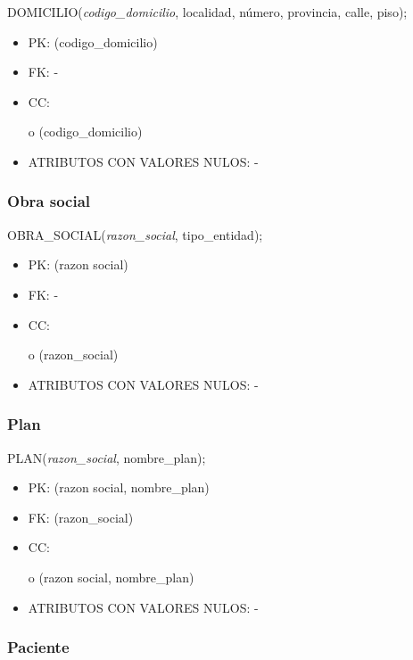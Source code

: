 \documentclass[a4paper,11pt]{article}
\begin{document}
DOMICILIO(\emph{codigo\_domicilio}, localidad, número, provincia, calle, piso);
\begin{itemize}
\item PK: (codigo\_domicilio)

\item FK: -

\item CC:

o (codigo\_domicilio)

\item ATRIBUTOS CON VALORES NULOS: -\label{HToc293405833}
\end{itemize}

\subsubsection{\textbf{Obra social}}

OBRA\_SOCIAL(\emph{razon\_social}, tipo\_entidad);

\begin{itemize}
\item PK: (razon social)

\item FK: -

\item CC:

o (razon\_social)

\item ATRIBUTOS CON VALORES NULOS: -\label{HToc293405834}
\end{itemize}

\subsubsection{\textbf{Plan}}

PLAN(\emph{razon\_social}, nombre\_plan);

\begin{itemize}
\item PK: (razon social, nombre\_plan)

\item FK: (razon\_social)

\item CC:

o (razon social, nombre\_plan)

\item ATRIBUTOS CON VALORES NULOS: -\label{HToc293405835}
\end{itemize}

\subsubsection{\textbf{Paciente}}
\end{document}
